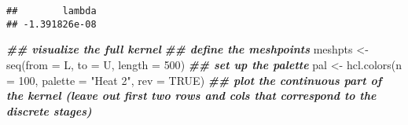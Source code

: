 \documentclass[
]{article}
\newenvironment{Shaded}{\begin{snugshade}}{\end{snugshade}}
\newcommand{\AttributeTok}[1]{\textcolor[rgb]{0.77,0.63,0.00}{#1}}
\newcommand{\ConstantTok}[1]{\textcolor[rgb]{0.00,0.00,0.00}{#1}}
\newcommand{\DecValTok}[1]{\textcolor[rgb]{0.00,0.00,0.81}{#1}}
\newcommand{\DocumentationTok}[1]{\textcolor[rgb]{0.56,0.35,0.01}{\textbf{\textit{#1}}}}
\newcommand{\FunctionTok}[1]{\textcolor[rgb]{0.00,0.00,0.00}{#1}}
\newcommand{\NormalTok}[1]{#1}
\newcommand{\OtherTok}[1]{\textcolor[rgb]{0.56,0.35,0.01}{#1}}
\newcommand{\StringTok}[1]{\textcolor[rgb]{0.31,0.60,0.02}{#1}}
\begin{document}
\begin{verbatim}
##        lambda 
## -1.391826e-08
\end{verbatim}

\begin{Shaded}
\begin{Highlighting}[]
\DocumentationTok{\#\# visualize the full kernel }
\DocumentationTok{\#\# define the meshpoints }
\NormalTok{meshpts }\OtherTok{\textless{}{-}} \FunctionTok{seq}\NormalTok{(}\AttributeTok{from =}\NormalTok{ L, }\AttributeTok{to =}\NormalTok{ U, }\AttributeTok{length =} \DecValTok{500}\NormalTok{)}
\DocumentationTok{\#\# set up the palette}
\NormalTok{pal }\OtherTok{\textless{}{-}} \FunctionTok{hcl.colors}\NormalTok{(}\AttributeTok{n =} \DecValTok{100}\NormalTok{, }\AttributeTok{palette =} \StringTok{"Heat 2"}\NormalTok{, }\AttributeTok{rev =} \ConstantTok{TRUE}\NormalTok{)}
\DocumentationTok{\#\# plot the continuous part of the kernel (leave out first two rows and cols that correspond to the discrete stages)}


\end{Highlighting}
\end{Shaded}
\end{document}
